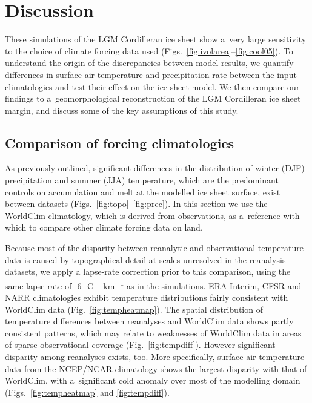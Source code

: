 \documentclass[tc, ms]{copernicus}
\begin{document}
\section{Discussion}
\label{sec:discussion}

These simulations of the LGM Cordilleran ice sheet show a~very large sensitivity to the choice of climate forcing data used (Figs.~\ref{fig:ivolarea}--\ref{fig:cool05}). To understand the origin of the discrepancies between model results, we quantify differences in surface air temperature and precipitation rate between the input climatologies and test their effect on the ice sheet model. We then compare our findings to a~geomorphological reconstruction of the LGM Cordilleran ice sheet margin, and discuss some of the key assumptions of this study.

\subsection{Comparison of forcing climatologies}

As previously outlined, significant differences in the distribution of winter (DJF) precipitation and summer (JJA) temperature, which are the predominant controls on accumulation and melt at the modelled ice sheet surface, exist between datasets (Figs.~\ref{fig:topo}--\ref{fig:prec}). In this section we use the WorldClim climatology, which is derived from observations, as a~reference with which to compare other climate forcing data on land.

Because most of the disparity between reanalytic and observational temperature data is caused by topographical detail at scales unresolved in the reanalysis datasets, we apply a lapse-rate correction prior to this comparison, using the same lapse rate of -6\,\unit{{\degree}C\,km^{-1}} as in the simulations. ERA-Interim, CFSR and NARR climatologies exhibit temperature distributions fairly consistent with WorldClim data (Fig.~\ref{fig:tempheatmap}). The spatial distribution of temperature differences between reanalyses and WorldClim data shows partly consistent patterns, which may relate to weaknesses of WorldClim data in areas of sparse observational coverage (Fig.~\ref{fig:tempdiff}). However significant disparity among reanalyses exists, too. More specifically, surface air temperature data from the NCEP/NCAR climatology shows the largest disparity with that of WorldClim, with a~significant cold anomaly over most of the modelling domain (Figs.~\ref{fig:tempheatmap} and \ref{fig:tempdiff}).
\end{document}
